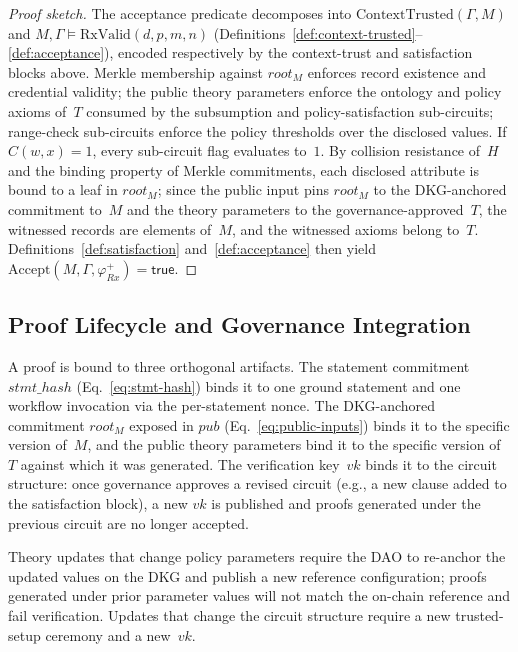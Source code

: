 \documentclass[journal]{IEEEtran}
\begin{document}
\begin{proof}[Proof sketch]
The acceptance predicate decomposes into
$\mathrm{ContextTrusted}(\Gamma,M)$ and
$M,\Gamma \models \mathrm{RxValid}(d,p,m,n)$
(Definitions~\ref{def:context-trusted}--\ref{def:acceptance}),
encoded respectively by the context-trust and satisfaction
blocks above.
Merkle membership against $\mathit{root}_M$ enforces
record existence and credential validity;
the public theory parameters enforce the ontology and policy
axioms of~$T$ consumed by the subsumption and policy-satisfaction sub-circuits;
range-check sub-circuits enforce the policy thresholds over
the disclosed values.
If $C(w,x)=1$, every sub-circuit flag evaluates to~$1$.
By collision resistance of~$H$ and the binding property of
Merkle commitments, each disclosed attribute is bound to a
leaf in $\mathit{root}_M$;
since the public input pins $\mathit{root}_M$ to the DKG-anchored
commitment to~$M$ and the theory parameters to the governance-approved~$T$,
the witnessed records are elements of~$M$, and the witnessed axioms
belong to~$T$.
Definitions~\ref{def:satisfaction}
and~\ref{def:acceptance} then yield
$\mathrm{Accept}(M,\Gamma,\varphi^{+}_{Rx})=\mathsf{true}$.
\end{proof}



\subsection{Proof Lifecycle and Governance Integration}
\label{sec:proof-lifecycle}

A proof is bound to three orthogonal artifacts.
The statement commitment $\mathit{stmt\_hash}$
(Eq.~\ref{eq:stmt-hash}) binds it to one ground statement
and one workflow invocation via the per-statement nonce.
The DKG-anchored commitment $\mathit{root}_M$ exposed
in $\mathit{pub}$ (Eq.~\ref{eq:public-inputs}) binds it to
the specific version of~$M$, and the public theory parameters
bind it to the specific version of~$T$ against which it was
generated.
The verification key~$\mathit{vk}$ binds it to the circuit
structure: once governance approves a revised circuit
(e.g., a new clause added to the satisfaction block), a new
$\mathit{vk}$ is published and proofs generated under the
previous circuit are no longer accepted.

Theory updates that change policy parameters require
the DAO to re-anchor the updated values on the DKG and
publish a new reference configuration; proofs generated
under prior parameter values will not match the on-chain
reference and fail verification. Updates that change the
circuit structure require a new trusted-setup ceremony
and a new~$\mathit{vk}$.
\end{document}
